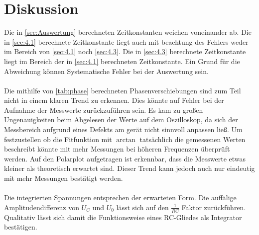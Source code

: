 \section{Diskussion}
\label{sec:Diskussion}
Die in \autoref{sec:Auswertung} berechneten Zeitkonstanten weichen voneinander ab. Die in \autoref{sec:4.1} berechnete Zeitkonstante
liegt auch mit beachtung des Fehlers weder im Bereich von \autoref{sec:4.1} noch \autoref{sec:4.3}. 
Die in \autoref{sec:4.3} berechnete Zeitkonstante liegt im Bereich der in \autoref{sec:4.1} berechneten Zeitkonstante.
Ein Grund für die Abweichung können Systematische Fehler bei der Auswertung sein.%
\\
\\
Die mithilfe von \autoref{tab:phase} berechneten Phasenverschiebungen sind zum Teil nicht in einem klaren Trend zu erkennen.
Dies könnte auf Fehler bei der Aufnahme der Messwerte zurückzuführen sein. Es kam zu großen Ungenauigkeiten beim Abgelesen 
der Werte auf dem Oszilloskop, da sich der Messbereich aufgrund eines Defekts am gerät nicht sinnvoll anpassen ließ. 
Um festzustellen ob die Fitfunktion mit $\arctan$ tatsächlich die gemessenen Werten beschreibt könnte mit mehr Messungen bei höheren Frequenzen überprüft werden. 
Auf den Polarplot aufgetragen ist erkennbar, dass die Messwerte etwas kleiner als theoretisch erwartet sind. Dieser Trend kann jedoch auch nur eindeutig mit mehr Messungen bestätigt werden.
\\
\\
Die integrierten Spannungen entsprechen der erwarteten Form.
Die auffälige Amplitudendifferenz von $U_C$ und $U_0$ lässt sich auf den $\frac{1}{RC}$ Faktor zurückführen.
Qualitativ lässt sich damit die Funktionsweise eines RC-Gliedes als Integrator bestätigen. 
\newpage